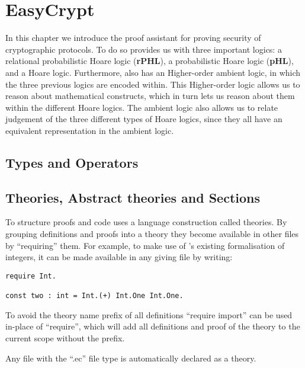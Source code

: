 \chapter{EasyCrypt}
\label{ch:EasyCrypt}


In this chapter we introduce the \easycrypt proof assistant for proving security
of cryptographic protocols.
To do so \easycrypt provides us with three important logics: a relational probabilistic
Hoare logic (\textbf{rPHL}), a probabilistic Hoare logic (\textbf{pHL}), and a
Hoare logic.
Furthermore, \easycrypt also has an Higher-order ambient logic, in which the three
previous logics are encoded within. This Higher-order logic allows us to reason
about mathematical constructs, which in turn lets us reason about them within
the different Hoare logics. The ambient logic also allows us to relate
judgement of the three different types of Hoare logics, since they all have an
equivalent representation in the ambient logic.

\section{Types and Operators}
\label{sec:ec_types_and_operators}

\section{Theories, Abstract theories and Sections}
\label{sec:ec_theories}
To structure proofs and code \easycrypt uses a language construction called
theories. By grouping definitions and proofs into a theory they become available
in other files by ``requiring'' them. For example, to make use of \easycrypt's
existing formalisation of integers, it can be made available in any giving file
by writing:

\begin{lstlisting}[float,label=lst:theory_require,caption=\easycrypt theories: importing definitions]
require Int.

const two : int = Int.(+) Int.One Int.One.
\end{lstlisting}

To avoid the theory name prefix of all definitions ``require import'' can be
used in-place of ``require'', which will add all definitions and proof of the
theory to the current scope without the prefix.

Any \easycrypt file with the ``.ec'' file type is automatically declared as a
theory.

